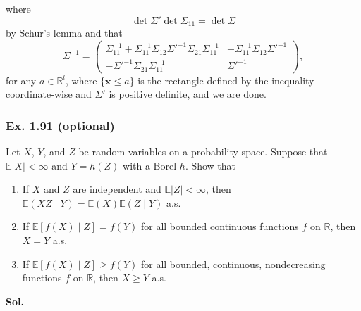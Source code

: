 \documentclass[lang=en,11pt,a4paper,citestyle=authoryear]{elegantpaper}
\newcommand{\R}{\mathbb{R}}
\newcommand{\E}{\mathbb{E}}
\begin{document}
where
\[
\det \Sigma' \det\Sigma_{11} = \det \Sigma
\]
by Schur's lemma and that
\[
\Sigma^{-1}=
\begin{pmatrix}
    \Sigma_{11}^{-1} + \Sigma_{11}^{-1}\Sigma_{12}\Sigma'^{-1}\Sigma_{21}\Sigma_{11}^{-1} & -\Sigma_{11}^{-1}\Sigma_{12}\Sigma'^{-1}\\
    -\Sigma'^{-1}\Sigma_{21}\Sigma_{11}^{-1} & \Sigma'^{-1}
\end{pmatrix},
\]
for any $a \in \R^l$, where $\{\mathbf{x} \leq a\}$ is the rectangle defined by the inequality coordinate-wise and $\Sigma'$ is positive definite, and we are done.
\vspace{1em}

\subsubsection*{Ex. 1.91 (optional)}
Let $X$, $Y$, and $Z$ be random variables on a probability space.
Suppose that $\E|X|<\infty$ and $Y=h(Z)$ with a Borel $h$. Show that
\begin{enumerate}[label=(\alph*),leftmargin=*]
\item If $X$ and $Z$ are independent and $\E|Z|<\infty$, then
$\E(XZ\mid Y)=\E(X)\E(Z\mid Y)$ a.s.
\item If $\E[f(X)\mid Z]=f(Y)$ for all bounded continuous functions $f$ on $\R$, then $X=Y$ a.s.
\item If $\E[f(X)\mid Z]\geq f(Y)$ for all bounded, continuous, nondecreasing functions $f$ on $\R$, then $X\geq Y$ a.s.
\end{enumerate}
\vspace{0.5em}
\textbf{Sol.}\par
\end{document}
